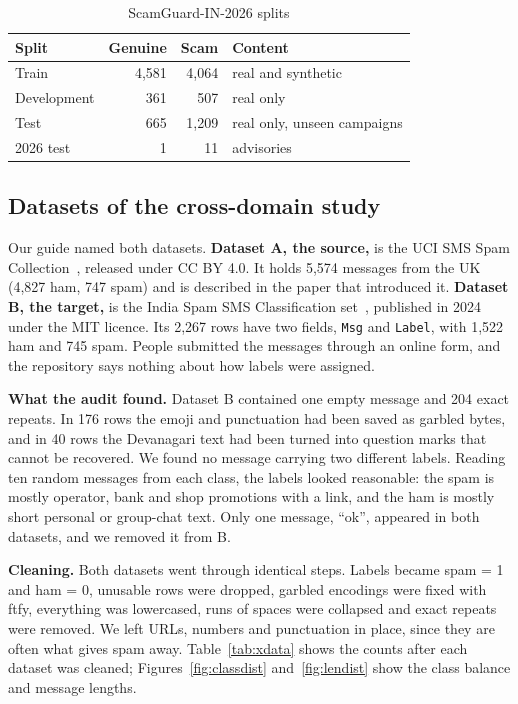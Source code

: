 \begin{table}[H]
\centering
\caption{ScamGuard-IN-2026 splits}
\label{tab:splits}
\begin{tabular}{|l|r|r|l|}
\hline
\textbf{Split} & \textbf{Genuine} & \textbf{Scam} & \textbf{Content} \\
\hline
Train & 4,581 & 4,064 & real and synthetic \\
\hline
Development & 361 & 507 & real only \\
\hline
Test & 665 & 1,209 & real only, unseen campaigns \\
\hline
2026 test & 1 & 11 & advisories \\
\hline
\end{tabular}
\end{table}

\subsection{Datasets of the cross-domain study}
Our guide named both datasets. \textbf{Dataset A, the source,} is the UCI SMS Spam Collection~\cite{almeida2011contributions}, released under CC BY 4.0. It holds 5,574 messages from the UK (4,827 ham, 747 spam) and is described in the paper that introduced it. \textbf{Dataset B, the target,} is the India Spam SMS Classification set~\cite{indiasms2024}, published in 2024 under the MIT licence. Its 2,267 rows have two fields, \texttt{Msg} and \texttt{Label}, with 1,522 ham and 745 spam. People submitted the messages through an online form, and the repository says nothing about how labels were assigned.

\textbf{What the audit found.} Dataset B contained one empty message and 204 exact repeats. In 176 rows the emoji and punctuation had been saved as garbled bytes, and in 40 rows the Devanagari text had been turned into question marks that cannot be recovered. We found no message carrying two different labels. Reading ten random messages from each class, the labels looked reasonable: the spam is mostly operator, bank and shop promotions with a link, and the ham is mostly short personal or group-chat text. Only one message, ``ok'', appeared in both datasets, and we removed it from B.

\textbf{Cleaning.} Both datasets went through identical steps. Labels became spam = 1 and ham = 0, unusable rows were dropped, garbled encodings were fixed with ftfy, everything was lowercased, runs of spaces were collapsed and exact repeats were removed. We left URLs, numbers and punctuation in place, since they are often what gives spam away. Table~\ref{tab:xdata} shows the counts after each dataset was cleaned; Figures~\ref{fig:classdist} and~\ref{fig:lendist} show the class balance and message lengths.


